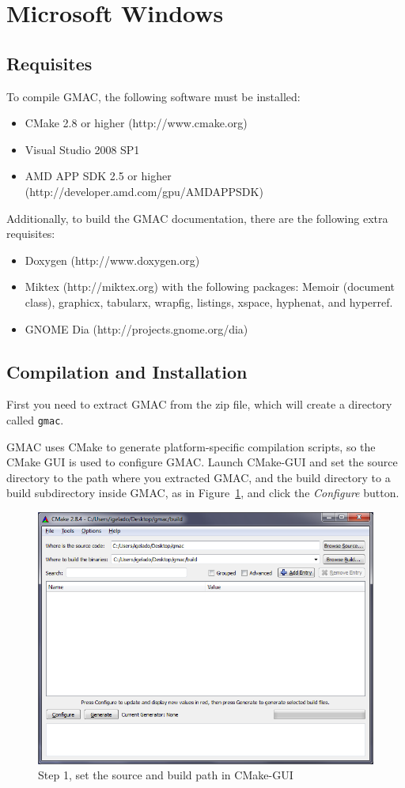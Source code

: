 \section{Microsoft Windows}

\subsection{Requisites}

To compile GMAC, the following software must be installed:
\begin{itemize}
\item CMake 2.8 or higher (http://www.cmake.org)
\item Visual Studio 2008 SP1
\item AMD APP SDK 2.5 or higher (http://developer.amd.com/gpu/AMDAPPSDK)
\end{itemize}

Additionally, to build the GMAC documentation, there are the following extra requisites:
\begin{itemize}
\item Doxygen (http://www.doxygen.org)
\item Miktex (http://miktex.org) with the following packages: Memoir (document class), 
graphicx, tabularx, wrapfig, listings, xspace, hyphenat, and hyperref.
\item GNOME Dia (http://projects.gnome.org/dia)
\end{itemize}

\subsection{Compilation and Installation}
First you need to extract GMAC from the zip file, which will create a directory called 
\texttt{gmac}. 

GMAC uses CMake to generate platform\hyp{}specific compilation scripts, so the CMake GUI is used to 
configure GMAC\@. Launch CMake\hyp{}GUI and set the source directory to the path where you extracted 
GMAC, and the build directory to a build subdirectory inside GMAC, as in 
Figure~\ref{fig:install:cmake-init}, and click the \emph{Configure} button.
\begin{figure}[h]
\centering
\includegraphics[width=0.8\linewidth]{installation/figures/cmake-init}
\caption{Step 1, set the source and build path in CMake\hyp{}GUI}
\label{fig:install:cmake-init}
\end{figure}

